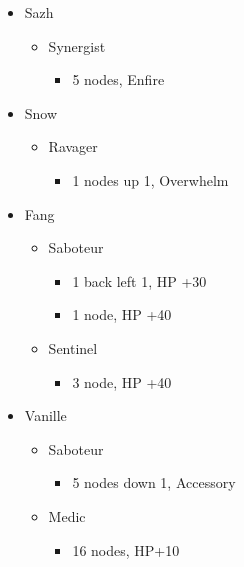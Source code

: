 \begin{paracol}{2}
	\switchcolumn*
	\begin{menu}
		\begin{itemize}
			\crystarium
			\begin{itemize}
				\item Sazh
				      \begin{itemize}
					      \item Synergist
					            \begin{itemize}
						            \item 5 nodes, Enfire
					            \end{itemize}
				      \end{itemize}
				\item Snow
				      \begin{itemize}
					      \item Ravager
					            \begin{itemize}
						            \item 1 nodes up 1, Overwhelm
					            \end{itemize}
				      \end{itemize}
				\item Fang
				      \begin{itemize}
					      \item Saboteur
					            \begin{itemize}
						            \item 1 back left 1, HP +30
						            \item 1 node, HP +40
					            \end{itemize}
					      \item Sentinel
					            \begin{itemize}
						            \item 3 node, HP +40
					            \end{itemize}
				      \end{itemize}
				\item Vanille
				      \begin{itemize}
					      \item Saboteur
					            \begin{itemize}
						            \item 5 nodes down 1, Accessory
					            \end{itemize}
					      \item Medic
					            \begin{itemize}
						            \item 16 nodes, HP+10
					            \end{itemize}
				      \end{itemize}
			\end{itemize}


\end{itemize}
\end{menu}
\end{paracol}

